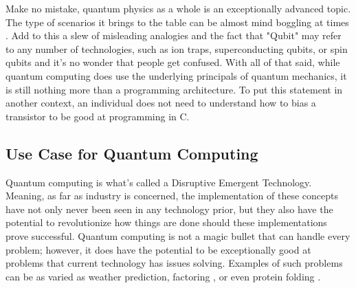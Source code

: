 \documentclass[a4paper]{article}
\begin{document}




Make no mistake, quantum physics as a whole is an exceptionally advanced topic.  The type of scenarios it brings to the table can be almost mind boggling at times \cite{mindBoggle}.  Add to this a slew of misleading analogies and the fact that "Qubit" may refer to any number of technologies, such as ion traps, superconducting qubits, or spin qubits and it's no wonder that people get confused.   With all of that said, while quantum computing does use the underlying principals of quantum mechanics, it is still nothing more than a programming architecture.  To put this statement in another context, an individual does not need to understand how to bias a transistor to be good at programming in C.

\subsection{Use Case for Quantum Computing} 
Quantum computing is what's called a Disruptive Emergent Technology.  Meaning, as far as industry is concerned, the implementation of these concepts have not only never been seen in any technology prior, but they also have the potential to revolutionize how things are done should these implementations prove successful.  Quantum computing is not a magic bullet that can handle every problem; however, it does have the potential to be exceptionally good at problems that current technology has issues solving.  Examples of such problems can be as varied as weather prediction, factoring \cite{shorsAlgorithm}, or even protein folding \cite{dwavepfold}. 
\end{document}

